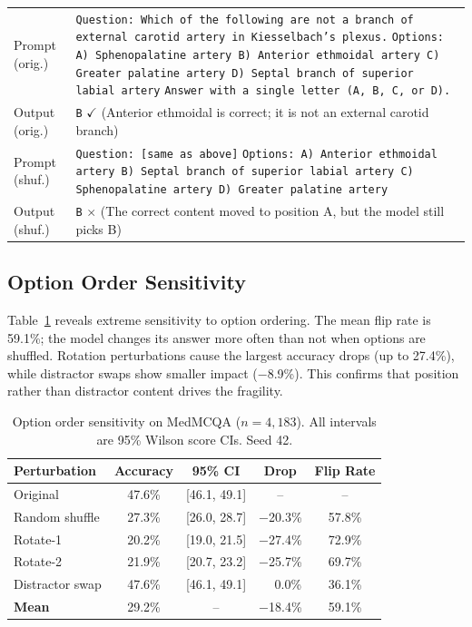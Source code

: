 \documentclass[runningheads,a4paper]{llncs}
\begin{document}
\begin{table}[t]
\begin{tabular}{p{1.8cm}p{8.7cm}}
\midrule
Prompt (orig.) & \texttt{Question: Which of the following are not a branch of external carotid artery in Kiesselbach's plexus.} \newline \texttt{Options: A) Sphenopalatine artery\; B) Anterior ethmoidal artery\; C) Greater palatine artery\; D) Septal branch of superior labial artery} \newline \texttt{Answer with a single letter (A, B, C, or D).} \\
\addlinespace
Output (orig.) & \texttt{B} \quad $\checkmark$ \quad (Anterior ethmoidal is correct; it is not an external carotid branch) \\
\midrule
Prompt (shuf.) & \texttt{Question: [same as above]} \newline \texttt{Options: A) Anterior ethmoidal artery\; B) Septal branch of superior labial artery\; C) Sphenopalatine artery\; D) Greater palatine artery} \\
\addlinespace
Output (shuf.) & \texttt{B} \quad $\times$ \quad (The correct content moved to position A, but the model still picks B) \\
\bottomrule
\end{tabular}
\end{table}

\subsection{Option Order Sensitivity}

Table~\ref{tab:option_order} reveals extreme sensitivity to option ordering. The mean flip rate is 59.1\%; the model changes its answer more often than not when options are shuffled. Rotation perturbations cause the largest accuracy drops (up to 27.4\%), while distractor swaps show smaller impact ($-$8.9\%). This confirms that position rather than distractor content drives the fragility.

\begin{table}[t]
\centering
\caption{Option order sensitivity on MedMCQA ($n{=}4{,}183$). All intervals are 95\% Wilson score CIs. Seed 42.}
\label{tab:option_order}
\begin{tabular}{lcccc}
\toprule
\textbf{Perturbation} & \textbf{Accuracy} & \textbf{95\% CI} & \textbf{Drop} & \textbf{Flip Rate} \\
\midrule
Original & 47.6\% & [46.1, 49.1] & -- & -- \\
Random shuffle & 27.3\% & [26.0, 28.7] & $-$20.3\% & 57.8\% \\
Rotate-1 & 20.2\% & [19.0, 21.5] & $-$27.4\% & 72.9\% \\
Rotate-2 & 21.9\% & [20.7, 23.2] & $-$25.7\% & 69.7\% \\
Distractor swap & 47.6\% & [46.1, 49.1] & $\phantom{-}$0.0\% & 36.1\% \\
\midrule
\textbf{Mean} & 29.2\% & -- & $-$18.4\% & 59.1\% \\
\bottomrule
\end{tabular}
\end{table}
\end{document}

